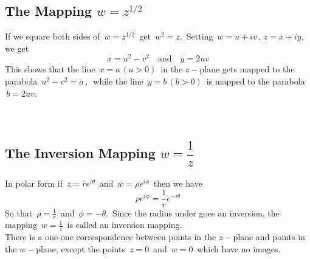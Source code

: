 \documentclass[11pt,a4paper]{article}
\theoremstyle{definition}
\begin{document}
{\color[wave]{485}\subsection{The Mapping $w = z^{1/2}$}}
If we square both sides of $\, w = z^{1/2}\,$ get $\, w^2 = z.\,$ Setting $\, w = u + iv\,, \,  z = x+ iy,\,$  we get $$\boxed{x = u^2 - v^2 \quad \text{and}\quad  y = 2uv}$$
This shows that the line $\, x = a\, (a> 0)\,$ in the $z-$plane gets mapped to the parabola $\, u^2 - v^2 = a\,, \,$ while the line $\, y = b\, (b> 0)\,$ is mapped to the parabola $\, b = 2uv$.\\\\\\





\pagebreak
{\color[wave]{485}\subsection{The Inversion Mapping $w = \dfrac{1}{z}$}}
In polar form if $\, z = re^{i\theta}\,$ and $ \, w = \rho e^{i\phi}\,$ then we have $$\boxed{\rho e^{i\phi}  = \frac{1}{r}e^{-i\theta}}$$
So that $\,\rho = \frac{1}{r}\,$ and $\, \phi = -\theta.\,$ Since the radius under goes an inversion, the mapping $\, w = \frac{1}{z}\,$ is called an inversion mapping.\\
There is a one-one correspondence between points in the $z-$plane and points in the $w-$plane, except the points $\, z = 0\,$ and $\, w = 0\,$ which have no images.


\end{document}
